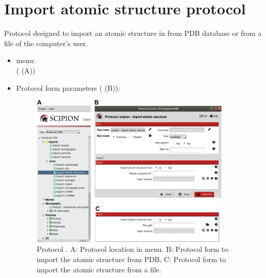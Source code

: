 \section{Import atomic structure protocol}
\label{app:importAtomicStructure}%
Protocol designed to import an atomic structure in \scipion from PDB database or from a file of the computer's user.
   
 \begin{itemize}
  \item \scipion menu:\\
   ( (A))\\
  
  \item Protocol form parameters ( (B)):\\
  
  \begin{figure}[H]
    \centering 
    \captionsetup{width=.7\linewidth} 
    \includegraphics[width=0.90\textwidth]{Images_appendix/Fig110.pdf}
    \caption{Protocol . A: Protocol location in \scipion menu. B: Protocol form to import the atomic structure from PDB. C: Protocol form to import the atomic structure from a file.}
    \label{fig:app_protocol_atomicStructure_1}
   \end{figure}


\end{itemize}
